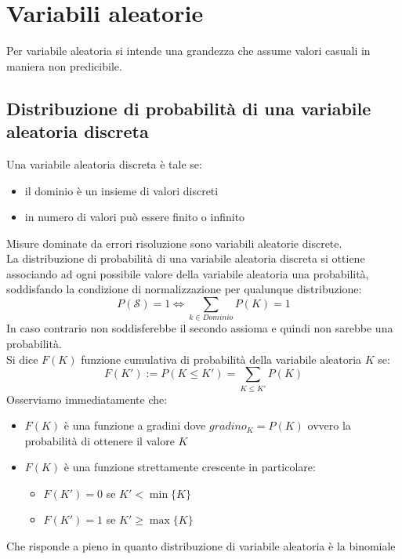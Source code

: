 \documentclass[11pt,a4paper]{book}
\begin{document}
\chapter{Variabili aleatorie} 
Per variabile aleatoria si intende una grandezza che assume valori casuali in maniera non predicibile.
\section[Distribuzione aleatoria discreta]{Distribuzione di probabilità di una variabile \\aleatoria discreta} 
Una variabile aleatoria discreta è tale se:
\begin{itemize}
\item il dominio è un insieme di valori discreti
\item in numero di valori può essere finito o infinito
\end{itemize}
Misure dominate da errori risoluzione sono variabili aleatorie discrete.\\
La distribuzione di probabilità di una variabile aleatoria discreta si ottiene associando ad ogni possibile valore della variabile aleatoria una probabilità, soddisfando la condizione di normalizzazione per qualunque distribuzione:
\begin{equation}
P(\mathcal{S})=1 \Leftrightarrow \sum\limits_{k \in \textit{Dominio}}P(K)=1
\end{equation}
In caso contrario non soddisferebbe il secondo assioma e quindi non sarebbe una probabilità.\\
Si dice $ F(K) $ funzione cumulativa di probabilità della variabile aleatoria $ K $ se: 
\begin{equation}
F(K'):=P(K\leq K') = \sum\limits_{K \leq K'}P(K)
\end{equation}
Osserviamo immediatamente che:
\begin{itemize}
\item $ F(K) $ è una funzione a gradini dove $ gradino_K = P(K) $ ovvero la probabilità di ottenere  il valore $ K $
\item $ F(K) $ è una funzione strettamente crescente in particolare:
\begin{itemize}
\item $ F(K')=0 $ se $ K' < \min\{K\} $
\item $ F(K')=1 $ se $ K' \geq \max\{K\} $
\end{itemize}
\end{itemize}
Che risponde a pieno in quanto distribuzione di variabile aleatoria è la binomiale
\end{document}
